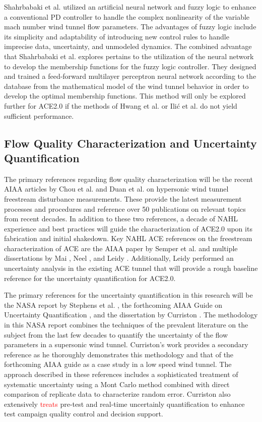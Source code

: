 Shahrbabaki et al. \cite{shahrbabaki-1} utilized an artificial neural network and fuzzy logic to enhance a conventional PD controller to handle the complex nonlinearity of the variable mach number wind tunnel flow parameters. The advantages of fuzzy logic include its simplicity and adaptability of introducing new control rules to handle imprecise data, uncertainty, and unmodeled dynamics. The combined advantage that Shahrbabaki et al. explores pertains to the utilization of the neural network to develop the membership functions for the fuzzy logic controller. They designed and trained a feed-forward multilayer perceptron neural network according to the database from the mathematical model of the wind tunnel behavior in order to develop the optimal membership functions. This method will only be explored further for ACE2.0 if the methods of Hwang et al. or Ili\'c et al. do not yield sufficient performance.

\subsection{Flow Quality Characterization and Uncertainty Quantification}
The primary references regarding flow quality characterization will be the recent AIAA articles by Chou et al. \cite{chou} and Duan et al. \cite{duan} on hypersonic wind tunnel freestream disturbance measurements. These provide the latest measurement processes and procedures and reference over 50 publications on relevant topics from recent decades. In addition to these two references, a decade of NAHL experience and best practices will guide the characterization of ACE2.0 upon its fabrication and initial shakedown. Key NAHL ACE references on the freestream characterization of ACE are the AIAA paper by Semper et al. \cite{aceturb} and multiple dissertations by Mai \cite{mai-dis}, Neel \cite{neel-dis}, and Leidy \cite{leidy-dis}. Additionally, Leidy performed an uncertainty analysis in the existing ACE tunnel that will provide a rough baseline reference for the uncertainty quantification for ACE2.0.

The primary references for the uncertainty quantification in this research will be the NASA report by Stephens et al. \cite{stephens-hubbard}, the forthcoming AIAA Guide on Uncertainty Quantification \cite{uq-aiaa}, and the dissertation by Curriston \cite{curriston-dis}. The methodology in this NASA report combines the techniques of the prevalent literature on the subject from the last few decades to quantify the uncertainty of the flow parameters in a supersonic wind tunnel. Curriston's work provides a secondary reference as he thoroughly demonstrates this methodology and that of the forthcoming AIAA guide as a case study in a low speed wind tunnel. The approach described in these references includes a sophisticated treatment of systematic uncertainty using a Mont Carlo method combined with direct comparison of replicate data to characterize random error. Curriston \cite{curriston-dis} also extensively \textcolor{red}{treats} pre-test and real-time uncertainly quantification to enhance test campaign quality control and decision support.

